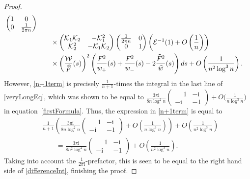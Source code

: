\documentclass[11pt]{article}
\numberwithin{equation}{section}
\newcommand{\cK}{\mathcal{K}}
\newcommand{\cE}{\mathcal{E}}
\newcommand{\cW}{\mathcal{W}}
\newcommand{\hw}{\widehat w}
\newcommand{\hF}{\widehat F}
\newcommand{\hFw}{\frac{\hF^2}{\hw}}
\newcommand{\I}{\mathrm{i}}
\numberwithin{equation}{section}
\begin{document}
\begin{proof}
\begin{align}
 \begin{pmatrix}
 1 & 0
 \\
 0 & \frac{1}{2\pi n}
 \end{pmatrix}\nonumber
 \\
 &\qquad\times \begin{pmatrix}
 \cK_1\cK_2 & -\cK^2_1
 \\
 \cK^2_2 & -\cK_1\cK_2
 \end{pmatrix}
 \begin{pmatrix}
 \frac{1}{2\pi n} & 0
 \\
 0 & 1
 \end{pmatrix}
 \left( \cE^{-1}(1) + O\left( \frac{1}{n} \right)\right)\nonumber
 \\
 &\qquad\times
 \left(\frac{\cW}{\hF}(s)\right)^2
 \left(\frac{F^2}{w_+}(s)+\frac{F^2}{w_-}(s)-2\hFw(s)\right){\rm d}s
+O\left(\frac{1}{n^2\log^3 n}\right).\label{n+1term}
\end{align}
However, \eqref{n+1term} is precisely $\frac{1}{n+1}$-times the integral in the last line of \eqref{veryLongEq}, which was shown to be equal to $\frac{3\pi\I}{8n \log^2n} \left(\begin{smallmatrix}
\phantom{-}1 & -\I\\
-\I & -1
\end{smallmatrix}\right)+ O\big(\frac{1}{n\log^3 n}\big)$ in equation~\eqref{firstFormula}. Thus, the expression in \eqref{n+1term} is equal to
\begin{align*}
 &\frac{1}{n+1}\left(\frac{3\pi\I}{8n \log^2n} \begin{pmatrix}
\phantom{-}1 & -\I\\
-\I & -1
\end{pmatrix}+ O\left(\frac{1}{n\log^3 n}\right)\right)+ O\left(\frac{1}{n^2\log^3 n}\right)
\\
&\qquad=\frac{3\pi\I}{8n^2 \log^2n} \begin{pmatrix}
\phantom{-}1 & -\I\\
-\I & -1
\end{pmatrix}+ O\left(\frac{1}{n^2\log^3 n}\right).
\end{align*}
Taking into account the $\frac{1}{2\pi \I}$-prefactor, this is seen to be equal to the right hand side of \eqref{differenceInt}, finishing the proof.
\end{proof}
\end{document}
